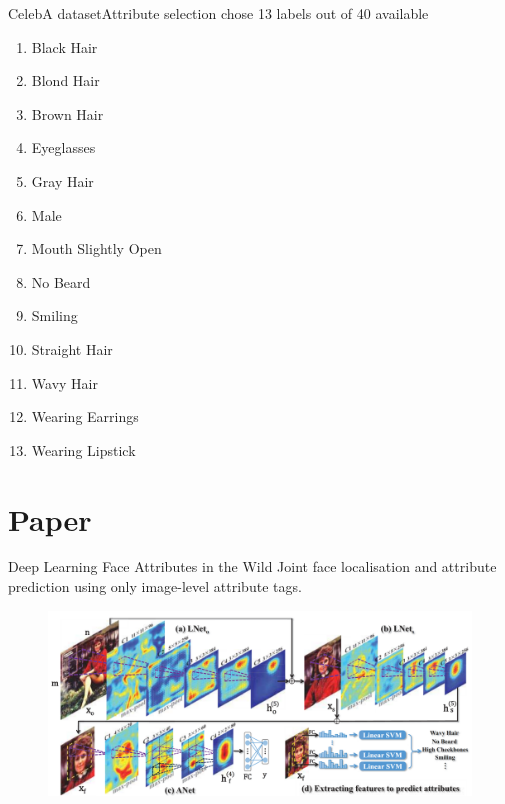 \documentclass{beamer}
\begin{document}
\begin{frame}{CelebA dataset}{Attribute selection}
	chose 13 labels out of 40 available
	\begin{multicols}{2}
	\begin{enumerate}
	\item Black Hair
	\item Blond Hair
	\item Brown Hair
	\item Eyeglasses
	\item Gray Hair
	\item Male
	\item Mouth Slightly Open
	\item No Beard
	\item Smiling
	\item Straight Hair
	\item Wavy Hair
	\item Wearing Earrings
	\item Wearing Lipstick
	\end{enumerate}
	\end{multicols}
\end{frame}

\section{Paper}
\begin{frame}{Deep Learning Face Attributes in the Wild}{\cite{liu2015faceattributes}}
	\centering
	Joint face localisation and attribute prediction using only image-level attribute tags.
	\begin{figure}
			\centering
			\includegraphics[width=\linewidth]{figures/paperArchitecture}
			\label{fig:paperarchi}
	\end{figure}
\end{frame}
\end{document}
